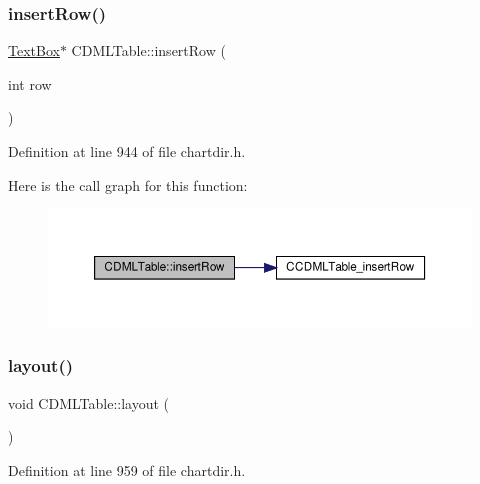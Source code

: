 \subsubsection{\texorpdfstring{insert\+Row()}{insertRow()}}
{\footnotesize\ttfamily \hyperlink{class_text_box}{Text\+Box}$\ast$ C\+D\+M\+L\+Table\+::insert\+Row (\begin{DoxyParamCaption}\item[{int}]{row }\end{DoxyParamCaption})\hspace{0.3cm}{\ttfamily [inline]}}



Definition at line 944 of file chartdir.\+h.

Here is the call graph for this function\+:
\nopagebreak
\begin{figure}[H]
\begin{center}
\leavevmode
\includegraphics[width=350pt]{class_c_d_m_l_table_aff5435de1e1d2a179c50030267feac49_cgraph}
\end{center}
\end{figure}
\mbox{\label{class_c_d_m_l_table_a78682ffb191bc413e1d1790399e4aeed}} 
\subsubsection{\texorpdfstring{layout()}{layout()}}
{\footnotesize\ttfamily void C\+D\+M\+L\+Table\+::layout (\begin{DoxyParamCaption}{ }\end{DoxyParamCaption})\hspace{0.3cm}{\ttfamily [inline]}}



Definition at line 959 of file chartdir.\+h.

